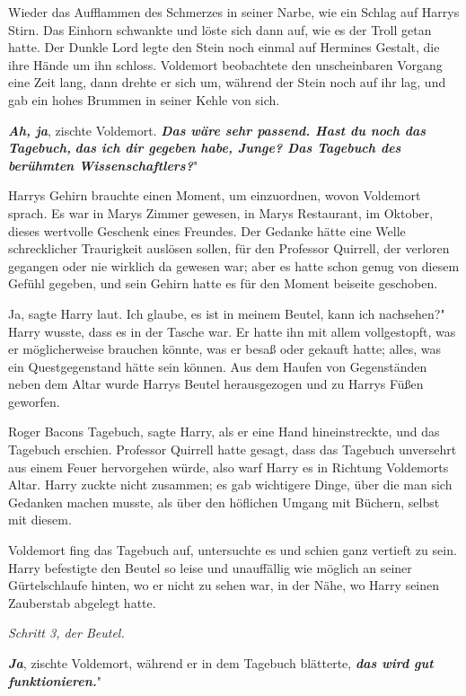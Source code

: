 Wieder das Aufflammen des Schmerzes in seiner Narbe, wie ein Schlag auf Harrys
Stirn. Das Einhorn schwankte und löste sich dann auf, wie es der Troll getan
hatte. Der Dunkle Lord legte den Stein noch einmal auf Hermines Gestalt, die
ihre Hände um ihn schloss. Voldemort beobachtete den unscheinbaren Vorgang eine
Zeit lang, dann drehte er sich um, während der Stein noch auf ihr lag, und gab
ein hohes Brummen in seiner Kehle von sich.

\glqq{}\textbf{\emph{Ah, ja}}\grqq{}, zischte Voldemort. \glqq{}\textbf{\emph{Das
wäre sehr passend. Hast du noch das Tagebuch,} }\textbf{\emph{das ich dir
gegeben habe, Junge? Das Tagebuch des berühmten Wissenschaftlers?}}"

Harrys Gehirn brauchte einen Moment, um einzuordnen, wovon Voldemort sprach. Es
war in Marys Zimmer gewesen, in Marys Restaurant, im Oktober, dieses wertvolle
Geschenk eines Freundes. Der Gedanke hätte eine Welle schrecklicher Traurigkeit
auslösen sollen, für den Professor Quirrell, der verloren gegangen oder nie
wirklich da gewesen war; aber es hatte schon genug von diesem Gefühl gegeben,
und sein Gehirn hatte es für den Moment beiseite geschoben.

\glqq{}Ja\grqq{}, sagte Harry laut. \glqq{}Ich glaube, es ist in meinem Beutel,
kann ich nachsehen?" Harry wusste, dass es in der Tasche war. Er hatte ihn mit
allem vollgestopft, was er möglicherweise brauchen könnte, was er besaß oder
gekauft hatte; alles, was ein Questgegenstand hätte sein können. Aus dem Haufen
von Gegenständen neben dem Altar wurde Harrys Beutel herausgezogen und zu Harrys
Füßen geworfen.

\glqq{}Roger Bacons Tagebuch\grqq{}, sagte Harry, als er eine Hand
hineinstreckte, und das Tagebuch erschien. Professor Quirrell hatte gesagt, dass
das Tagebuch unversehrt aus einem Feuer hervorgehen würde, also warf Harry es in
Richtung Voldemorts Altar. Harry zuckte nicht zusammen; es gab wichtigere Dinge,
über die man sich Gedanken machen musste, als über den höflichen Umgang mit
Büchern, selbst mit diesem.

Voldemort fing das Tagebuch auf, untersuchte es und schien ganz vertieft zu
sein. Harry befestigte den Beutel so leise und unauffällig wie möglich an seiner
Gürtelschlaufe hinten, wo er nicht zu sehen war, in der Nähe, wo Harry seinen
Zauberstab abgelegt hatte.

\emph{Schritt 3, der Beutel.}

\glqq{}\textbf{\emph{Ja}}\grqq{}, zischte Voldemort, während er in dem Tagebuch
blätterte, \glqq{}\textbf{\emph{das wird gut funktionieren.}}"

